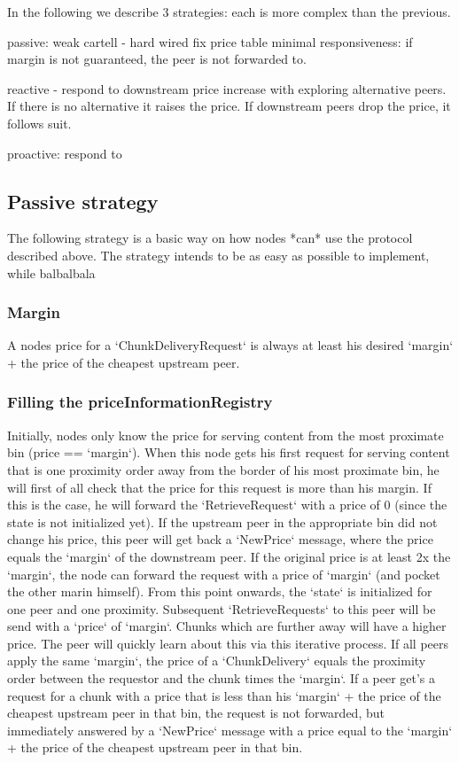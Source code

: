 In the following we describe 3 strategies: each is more complex than the previous.

passive: weak cartell - hard wired fix price table
minimal responsiveness: if margin is not guaranteed, the peer is not forwarded to. 

reactive - respond to downstream price increase with exploring alternative peers. If there is no alternative it raises the price. If downstream peers drop the price, it follows suit.

proactive: respond to 


\subsection{Passive strategy}\label{sec:pricing-retrieval}
The following strategy is a basic way on how nodes *can* use the protocol described above. The strategy intends to be as easy as possible to implement, while balbalbala

\subsubsection{Margin}
A nodes price for a `ChunkDeliveryRequest` is always at least his desired `margin` + the price of the cheapest upstream peer. 

\subsubsection{Filling the priceInformationRegistry}
Initially, nodes only know the price for serving content from the most proximate bin (price == `margin`). When this node gets his first request for serving content that is one proximity order away from the border of his most proximate bin, he will first of all check that the price for this request is more than his margin. If this is the case, he will forward the `RetrieveRequest` with a price of 0 (since the state is not initialized yet). If the upstream peer in the appropriate bin did not change his price, this peer will get back a `NewPrice` message, where the price equals the `margin` of the downstream peer. If the original price is at least 2x the `margin`, the node can forward the request with a price of `margin` (and pocket the other marin himself). From this point onwards, the `state` is initialized for one peer and one proximity. Subsequent `RetrieveRequests` to this peer will be send with a `price` of `margin`. Chunks which are further away will have a higher price. The peer will quickly learn about this via this iterative process. If all peers apply the same `margin`, the price of a `ChunkDelivery` equals the proximity order between the requestor and the chunk times the `margin`. If a peer get's a request for a chunk with a price that is less than his `margin` + the price of the cheapest upstream peer in that bin, the request is not forwarded, but immediately answered by a `NewPrice` message with a price equal to the `margin` + the price of the cheapest upstream peer in that bin.

